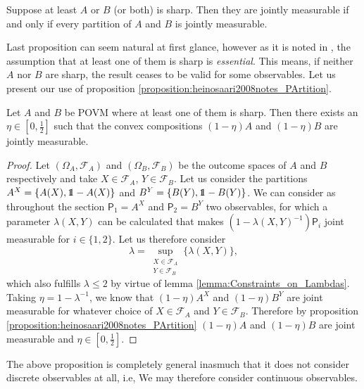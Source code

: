 \documentclass[10pt, a4paper]{amsart}
\begin{document}
\begin{proposition}\label{proposition:heinosaari2008notes_PArtition}
Suppose at least $A$ or $B$ (or both) is sharp. Then they are jointly measurable if and only if every partition of $A$ and $B$ is jointly measurable. 
\end{proposition}
Last proposition can seem natural at first glance, however as it is noted in  \cite{heinosaari2008notes}, the assumption that at least one of them is sharp is \textit{essential}. This means, if neither $A$ nor $B$ are sharp, the result ceases to be valid for some observables. Let us present our use of proposition \ref{proposition:heinosaari2008notes_PArtition}. 
\begin{proposition}\label{proposition:universality_of_noise_general}
Let $A$ and $B$ be POVM where at least one of them is sharp. Then there exists an $\eta\in \left [0,\frac{1}{2}\right ]$ such that  the convex compositions $(1-\eta)A $ and $(1-\eta)B $ are jointly measurable. 
\end{proposition} 
\begin{proof}
Let $(\Omega_{A}, \mathcal{F}_{A})$ and $(\Omega_{B}, \mathcal{F}_{B})$ be the outcome spaces of $A$ and $B$ respectively and take $X\in \mathcal{F}_{A}$, $Y\in \mathcal{F}_{B}$. Let us consider the partitions $ A^{X}  = \{A(X), \bbone - A(X)\}$ and $ B ^{Y} = \{B(Y), \bbone -B(Y)\}$. We can consider as throughout the section $\mathsf{P}_{1} = A^{X} $ and $\mathsf{P}_{2} = B^{Y}$ two observables, for which a parameter $\lambda(X,Y)$ can be calculated that makes $(1-\lambda(X,Y)^{-1})\mathsf{P}_{i}$ joint measurable for $i\in \{1,2\}$. Let us therefore consider 
$$
\lambda = \sup_{\substack{X\in \mathcal{F}_{A}\\
Y\in \mathcal{F}_{B}}}
\{
\lambda(X,Y)
\},
$$
which also fulfills $\lambda \leq 2$ by virtue of lemma \ref{lemma:Constraints_on_Lambdas}. Taking $\eta = 1- \lambda^{-1}$, we know that 
$(1-\eta) A^{X}$ and $(1-\eta)B^{Y}$ are joint measurable for whatever choice of $X\in \mathcal{F}_{A}$ and $Y\in \mathcal{F}_{B}$. Therefore by proposition \ref{proposition:heinosaari2008notes_PArtition} $(1-\eta)A $ and $(1-\eta)B $ are joint measurable and $\eta \in\left  [0, \frac{1}{2}\right ]$. 
\end{proof}
The above proposition is completely general inasmuch that it does not consider discrete observables at all, i.e, We may therefore consider continuous observables. 
\end{document}
